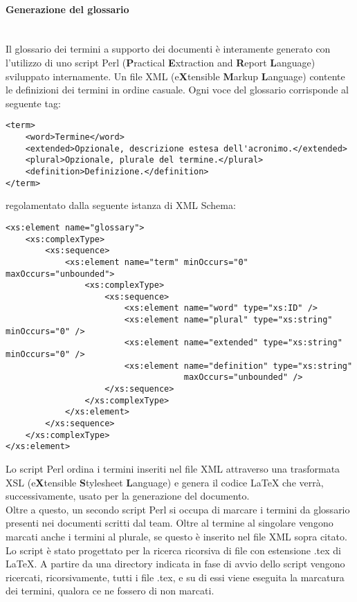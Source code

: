 \paragraph{Generazione del glossario} \mbox{} \\
Il glossario dei termini a supporto dei documenti è interamente generato con l'utilizzo di uno script Perl (\textbf{P}ractical \textbf{E}xtraction and \textbf{R}eport \textbf{L}anguage) sviluppato internamente. Un file XML (e\textbf{X}tensible \textbf{M}arkup \textbf{L}anguage) contente le definizioni dei termini in ordine casuale. Ogni voce del glossario corrisponde al seguente tag:
\begin{verbatim}
<term>
    <word>Termine</word>
    <extended>Opzionale, descrizione estesa dell'acronimo.</extended>
    <plural>Opzionale, plurale del termine.</plural>
    <definition>Definizione.</definition>
</term>
\end{verbatim}
regolamentato dalla seguente istanza di XML Schema:
\begin{verbatim}
<xs:element name="glossary">
    <xs:complexType>
        <xs:sequence>
            <xs:element name="term" minOccurs="0" maxOccurs="unbounded">
                <xs:complexType>
                    <xs:sequence>
                        <xs:element name="word" type="xs:ID" />
                        <xs:element name="plural" type="xs:string" minOccurs="0" />
                        <xs:element name="extended" type="xs:string" minOccurs="0" />
                        <xs:element name="definition" type="xs:string"
                                    maxOccurs="unbounded" />
                    </xs:sequence>
                </xs:complexType>
            </xs:element>
        </xs:sequence>
    </xs:complexType>
</xs:element>
\end{verbatim}
Lo script Perl ordina i termini inseriti nel file XML attraverso una trasformata XSL (e\textbf{X}tensible \textbf{S}tylesheet \textbf{L}anguage) e genera il codice \LaTeX{} che verrà, successivamente, usato per la generazione del documento. \\
Oltre a questo, un secondo script Perl si occupa di marcare i termini da glossario presenti nei documenti scritti dal team. Oltre al termine al singolare vengono marcati anche i termini al plurale, se questo è inserito nel file XML sopra citato. Lo script è stato progettato per la ricerca ricorsiva di file con estensione .tex di \LaTeX. A partire da una directory indicata in fase di avvio dello script vengono ricercati, ricorsivamente, tutti i file .tex, e su di essi viene eseguita la marcatura dei termini, qualora ce ne fossero di non marcati.


